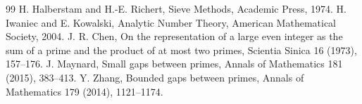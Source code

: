\documentclass[11pt,a4paper]{article}
\begin{document}
\begin{thebibliography}{99}
 H. Halberstam and H.-E. Richert, Sieve Methods, Academic Press, 1974.
 H. Iwaniec and E. Kowalski, Analytic Number Theory, American Mathematical Society, 2004.
 J. R. Chen, On the representation of a large even integer as the sum of a prime and the product of at most two primes, Scientia Sinica 16 (1973), 157--176.
 J. Maynard, Small gaps between primes, Annals of Mathematics 181 (2015), 383--413.
 Y. Zhang, Bounded gaps between primes, Annals of Mathematics 179 (2014), 1121--1174.
\end{thebibliography}
\end{document}
